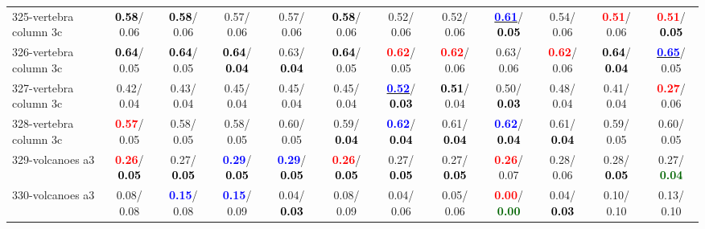 \begin{table}[h]
\begin{center}
{\begin{tabular}{lc|c|c|c|c|c|c|c|c|c|c}
325-vertebra column 3c & \textcolor{black}{\textbf{  0.58}}/  0.06 & \textcolor{black}{\textbf{  0.58}}/  0.06 &   0.57/  0.06 &   0.57/  0.06 & \textcolor{black}{\textbf{  0.58}}/  0.06 &   0.52/  0.06 &   0.52/  0.06 & \underline{\textcolor{blue}{\textbf{  0.61}}}/\textcolor{black}{\textbf{  0.05}} &   0.54/  0.06 & \textcolor{red}{\textbf{  0.51}}/  0.06 & \textcolor{red}{\textbf{  0.51}}/\textcolor{black}{\textbf{  0.05}} \\
326-vertebra column 3c & \textcolor{black}{\textbf{  0.64}}/  0.05 & \textcolor{black}{\textbf{  0.64}}/  0.05 & \textcolor{black}{\textbf{  0.64}}/\textcolor{black}{\textbf{  0.04}} &   0.63/\textcolor{black}{\textbf{  0.04}} & \textcolor{black}{\textbf{  0.64}}/  0.05 & \textcolor{red}{\textbf{  0.62}}/  0.05 & \textcolor{red}{\textbf{  0.62}}/  0.06 &   0.63/  0.06 & \textcolor{red}{\textbf{  0.62}}/  0.06 & \textcolor{black}{\textbf{  0.64}}/\textcolor{black}{\textbf{  0.04}} & \underline{\textcolor{blue}{\textbf{  0.65}}}/  0.05 \\
327-vertebra column 3c &   0.42/  0.04 &   0.43/  0.04 &   0.45/  0.04 &   0.45/  0.04 &   0.45/  0.04 & \underline{\textcolor{blue}{\textbf{  0.52}}}/\textcolor{black}{\textbf{  0.03}} & \textcolor{black}{\textbf{  0.51}}/  0.04 &   0.50/\textcolor{black}{\textbf{  0.03}} &   0.48/  0.04 &   0.41/  0.04 & \textcolor{red}{\textbf{  0.27}}/  0.06 \\ \hline
328-vertebra column 3c & \textcolor{red}{\textbf{  0.57}}/  0.05 &   0.58/  0.05 &   0.58/  0.05 &   0.60/  0.05 &   0.59/\textcolor{black}{\textbf{  0.04}} & \textcolor{blue}{\textbf{  0.62}}/\textcolor{black}{\textbf{  0.04}} &   0.61/\textcolor{black}{\textbf{  0.04}} & \textcolor{blue}{\textbf{  0.62}}/\textcolor{black}{\textbf{  0.04}} &   0.61/\textcolor{black}{\textbf{  0.04}} &   0.59/  0.05 &   0.60/  0.05 \\
329-volcanoes a3 & \textcolor{red}{\textbf{  0.26}}/\textcolor{black}{\textbf{  0.05}} &   0.27/\textcolor{black}{\textbf{  0.05}} & \textcolor{blue}{\textbf{  0.29}}/\textcolor{black}{\textbf{  0.05}} & \textcolor{blue}{\textbf{  0.29}}/\textcolor{black}{\textbf{  0.05}} & \textcolor{red}{\textbf{  0.26}}/\textcolor{black}{\textbf{  0.05}} &   0.27/\textcolor{black}{\textbf{  0.05}} &   0.27/\textcolor{black}{\textbf{  0.05}} & \textcolor{red}{\textbf{  0.26}}/  0.07 &   0.28/  0.06 &   0.28/\textcolor{black}{\textbf{  0.05}} &   0.27/\textcolor{darkgreen}{\textbf{  0.04}} \\
330-volcanoes a3 &   0.08/  0.08 & \textcolor{blue}{\textbf{  0.15}}/  0.08 & \textcolor{blue}{\textbf{  0.15}}/  0.09 &   0.04/\textcolor{black}{\textbf{  0.03}} &   0.08/  0.09 &   0.04/  0.06 &   0.05/  0.06 & \textcolor{red}{\textbf{  0.00}}/\textcolor{darkgreen}{\textbf{  0.00}} &   0.04/\textcolor{black}{\textbf{  0.03}} &   0.10/  0.10 &   0.13/  0.10 \\

\end{tabular}}
\end{center}
\end{table}

